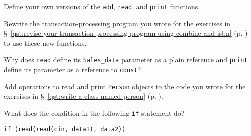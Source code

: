 %
%
\begin{question}
Define your own versions of the \verb|add|, \verb|read|, and \verb|print|
functions.
\end{question}

\begin{question}
Rewrite the transaction-processing program you wrote for the
exercises in \S~\ref{qst:revise your transaction-processing program using combine and isbn} (p. \pageref{qst:revise your transaction-processing program using combine and isbn}) to use these new functions.
\end{question}

\begin{question}
Why does \verb|read| define its \verb|Sales_data| parameter as a plain
reference and \verb|print| define its parameter as a reference to \verb|const|?
\end{question}

\begin{question}
Add operations to read and print \verb|Person| objects to the code
you wrote for the exercises in \S~\ref{qst:write a class named person} (p. \pageref{qst:write a class named person}).
\end{question}

\begin{question}
What does the condition in the following \verb|if| statement do?
\begin{lstlisting}
if (read(read(cin, data1), data2))
\end{lstlisting}
\end{question}
